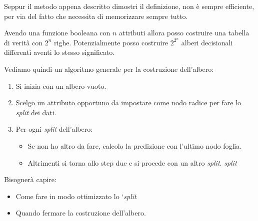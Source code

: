 Seppur il metodo appena descritto dimostri il definizione, non è sempre
efficiente, per via del fatto che necessita di memorizzare sempre tutto.
\begin{definizione}
  Avendo una funzione booleana con $n$ attributi allora posso costruire una
  tabella di verità con $2^n$ righe. Potenzialmente posso costruire 
  $2^{2^n}$ alberi decisionali differenti aventi lo stesso significato.
\end{definizione}
Vediamo quindi un algoritmo generale per la costruzione dell'albero:
\begin{enumerate}
  \item Si inizia con un albero vuoto.
  \item Scelgo un attributo opportuno da impostare come nodo radice per fare lo \textit{split} dei dati.
  \item Per ogni \textit{split} dell'albero:
  \begin{itemize}
    \item Se non ho altro da fare, calcolo la predizione con l'ultimo nodo foglia.
    \item Altrimenti si torna allo step due e si procede con un altro \textit{split}.
    \textit{split}
  \end{itemize}
\end{enumerate}
Bisognerà capire:
\begin{itemize}
  \item Come fare in modo ottimizzato lo `\textit{split}
  \item Quando fermare la costruzione dell'albero.
\end{itemize}
